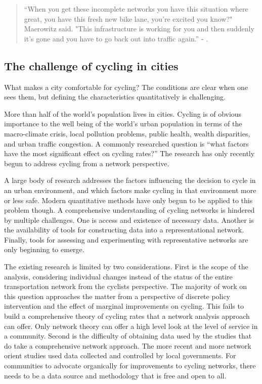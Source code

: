 

\begin{quote}
``When you get these incomplete networks you have this situation where great, you have this fresh new bike lane, you're excited you know?" Maerowitz said. "This infrastructure is working for you and then suddenly it's gone and you have to go back out into traffic again.'' - \cite{juhasz2019}.
\end{quote}
 
\subsection{The challenge of cycling in cities}

What makes a city comfortable for cycling? The conditions are clear when one sees them, but defining the characteristics quantitatively is challenging. 

More than half of the world's population lives in cities. Cycling is of obvious importance to the well being of the world's  urban population in terms of the macro-climate crisis, local pollution problems,  public health, wealth disparities, and urban traffic congestion. A commonly researched question is ``what factors have the most significant effect on cycling rates?'' The research has only recently begun to address cycling from a network perspective. 

A large body of research addresses the factors influencing the decision to cycle in an urban environment, and which factors make cycling in that environment more or less safe. Modern quantitative methods have only begun to be applied to this problem though. A comprehensive understanding of cycling networks is hindered by multiple challenges. One is access and existence of necessary data. Another is the availability of tools for constructing data into a representational network. Finally, tools for assessing and experimenting with representative networks are only beginning to emerge.   

The existing research is limited by two considerations. First is the scope of the analysis, considering individual changes instead of the status of the entire transportation network from the cyclists perspective.  The majority of work on this question approaches the matter from a perspective of discrete policy intervention and the effect of marginal improvements on cycling. This fails to build a comprehensive theory of cycling rates that a network analysis approach can offer. Only network theory can offer a high level look at the level of service in a community. Second is the difficulty of obtaining data used by the studies that do take a comprehensive network approach. The more recent and more network orient studies used data collected and controlled by local governments. For communities to advocate organically for improvements to cycling networks, there needs to be a data source and methodology that is free and open to all. 

